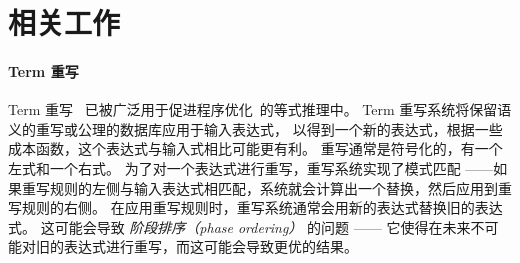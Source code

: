\section{相关工作}
\label{sec:related}

\paragraph{Term 重写}

Term 重写~\cite{rewritesystems} 已被广泛用于促进程序优化~\cite{DBLP:conf/scitools/BoyleHW96,
  DBLP:journals/toplas/BrandHKO02, DBLP:conf/icfp/VisserBT98}的等式推理中。
Term 重写系统将保留语义的重写或公理的数据库应用于输入表达式，
  以得到一个新的表达式，根据一些成本函数，这个表达式与输入式相比可能更有利。
  重写通常是符号化的，有一个左式和一个右式。
  为了对一个表达式进行重写，重写系统实现了模式匹配
  ——如果重写规则的左侧与输入表达式相匹配，系统就会计算出一个替换，然后应用到重写规则的右侧。
  在应用重写规则时，重写系统通常会用新的表达式替换旧的表达式。
  这可能会导致 \textit{阶段排序（phase ordering）} 的问题
  —— 它使得在未来不可能对旧的表达式进行重写，而这可能会导致更优的结果。


